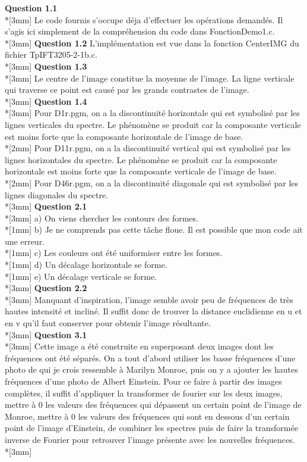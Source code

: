 \documentclass[11pt, letterpaper]{article}
\begin{document}
\par{
\textbf{Question 1.1} \\*[3mm]
Le code fournis s'occupe déja d'effectuer les opérations demandés. Il s'agis ici simplement de la compréhension du code dans FonctionDemo1.c. \\*[3mm]
\textbf{Question 1.2}
L'implémentation est vue dans la fonction CenterIMG du fichier TpIFT3205-2-1b.c. \\*[3mm]
\textbf{Question 1.3} \\*[3mm]
Le centre de l'image constitue la moyenne de l'image. La ligne verticale qui traverse ce point est causé par les grands contrastes de l'image. \\*[3mm]
\textbf{Question 1.4} \\*[3mm]
Pour D1r.pgm, on a la discontinuité horizontale qui est symbolisé par les lignes verticales du spectre. Le phénomène se produit car la composante verticale est moins forte que la composante horizontale de l'image de base. \\*[2mm]
Pour D11r.pgm, on a la discontinuité vertical qui est symbolisé par les lignes horizontales du spectre. Le phénomène se produit car la composante horizontale est moins forte que la composante verticale de l'image de base. \\*[2mm]
Pour D46r.pgm, on a la discontinuité diagonale qui est symbolisé par les lignes diagonales du spectre. \\*[3mm]
\textbf{Question 2.1} \\*[3mm]
a) On viens chercher les contours des formes. \\*[1mm]
b) Je ne comprends pas cette tâche floue. Il est possible que mon code ait une erreur. \\*[1mm]
c) Les couleurs ont été uniformiser entre les formes. \\*[1mm]
d) Un décalage horizontale se forme. \\*[1mm]
e) Un décalage verticale se forme. \\*[3mm]
\textbf{Question 2.2} \\*[3mm]
Manquant d'inspiration, l'image semble avoir peu de fréquences de très hautes intensité et incliné. Il suffit donc de trouver la distance euclidienne en u et en v qu'il faut conserver pour obtenir l'image résultante. \\*[3mm]
\textbf{Question 3.1} \\*[3mm]
Cette image a été construite en superposant deux images dont les fréquences ont été séparés. On a tout d'abord utiliser les basse fréquences d'une photo de qui je crois ressemble à Marilyn Monroe, puis on y a ajouter les hautes fréquences d'une photo de Albert Einstein. Pour ce faire à partir des images complètes, il suffit d'appliquer la transformer de fourier sur les deux images, mettre à 0 les valeurs des fréquences qui dépassent un certain point de l'image de Monroe, mettre à 0 les valeurs des fréquences qui sont en dessous d'un certain point de l'image d'Einstein, de combiner les spectres puis de faire la transformée inverse de Fourier pour retrouver l'image présente avec les nouvelles fréquences. \\*[3mm]
}
\end{document}
